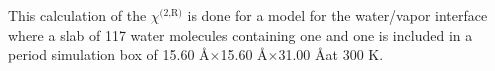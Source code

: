 This calculation of the $\chi^\text{(2,R)}$ is done for a model for the water/vapor interface 
where a slab of 117 water molecules containing one \Li and one \nitrate is included 
in a period simulation box of 15.60 \AA$\times$15.60 \AA$\times$31.00 \AA at 300 K.



